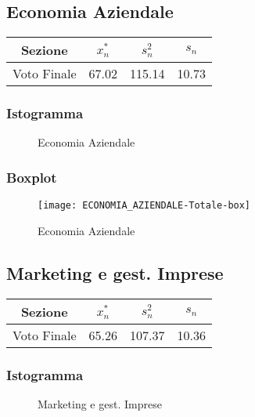 \thispagestyle{empty} %
\subsection{Economia Aziendale}

\begin{center}
\begin{tabular}{|c|c|c|c|}
  \hline
  Sezione & \(x_{n}^{*}\) & \(s_n^2\) & \(s_n\) \\
  \hline
  Voto Finale & 67.02 & 115.14 & 10.73 \\
  \hline
\end{tabular}
\end{center}

\subsubsection{Istogramma}
\begin{figure}[!h]
  \caption{Economia Aziendale}
\end{figure}

\subsubsection{Boxplot}
\begin{figure}[!h]
  \centering
  \texttt{[image: ECONOMIA\_AZIENDALE-Totale-box]}
  \caption{Economia Aziendale}
\end{figure}
\restoregeometry
\clearpage

\thispagestyle{empty} %
\subsection{Marketing e gest. Imprese}

\begin{center}
\begin{tabular}{|c|c|c|c|}
  \hline
  Sezione & \(x_{n}^{*}\) & \(s_n^2\) & \(s_n\) \\
  \hline
  Voto Finale & 65.26 & 107.37 & 10.36 \\
  \hline
\end{tabular}
\end{center}

\subsubsection{Istogramma}
\begin{figure}[!h]
  \caption{Marketing e gest. Imprese}
\end{figure}

